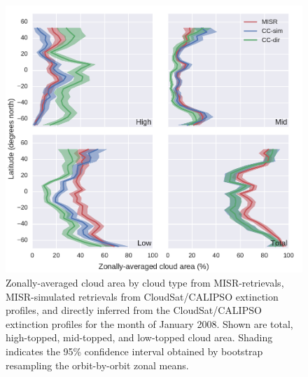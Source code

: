 \begin{figure}[tp]
\centering
\includegraphics{graphics/misr_cldmisr_zonal_2008-01.pdf}
\caption{\label{fig:misr_cldmisr_zonal_jan}Zonally-averaged cloud area
by cloud type from MISR-retrievals, MISR-simulated retrievals from
CloudSat/CALIPSO extinction profiles, and directly inferred from the
CloudSat/CALIPSO extinction profiles for the month of January 2008.
Shown are total, high-topped, mid-topped, and low-topped cloud area.
Shading indicates the 95\% confidence interval obtained by bootstrap
resampling the orbit-by-orbit zonal
means.}\label{fig:misrux5fcldmisrux5fzonalux5fjan}
\end{figure}

